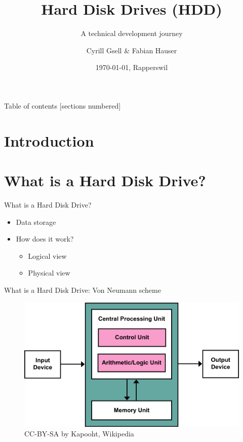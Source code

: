 \documentclass[12pt]{beamer}
\title{Hard Disk Drives (HDD)}
\subtitle{A technical development journey}
\date{\today, Rapperswil}
\author{Cyrill Gsell \& Fabian Hauser}
\institute{Computer Science \\
	TecBEC Presentation FS 2016}
\newlength{\wideitemsep}
\let\olditem\item
\renewcommand{\item}{\setlength{\itemsep}{\wideitemsep}\olditem}
\begin{document}
\maketitle

\begin{frame}{Table of contents}
  [sections numbered]
  \tableofcontents
\end{frame}

\section{Introduction}
\section{What is a Hard Disk Drive?}
\begin{frame}[fragile]{What is a Hard Disk Drive?}
	\begin{itemize}
		\item Data storage
		\item How does it work?
			\begin{itemize}
				\item Logical view
				\item Physical view
			\end{itemize}
	\end{itemize}
\end{frame}

\begin{frame}[fragile]{What is a Hard Disk Drive: Von Neumann scheme}
	\begin{figure}[p]
		\centering
		\includegraphics[width=\linewidth]{img/vonneumann.png}
		\caption{CC-BY-SA by Kapooht, Wikipedia}
	\end{figure}
\end{frame}
\end{document}
